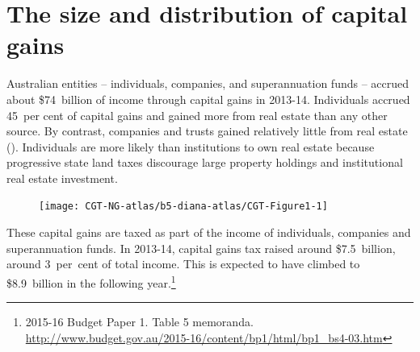 \section{The size and distribution of capital gains}




Australian entities -- individuals, companies, and superannuation funds -- accrued about \$74~billion of income through capital gains in 2013-14. Individuals accrued 45~per cent
of capital gains and gained more from real estate than any other source. By contrast, companies and trusts gained relatively little from real estate (). Individuals are more likely than institutions to own real estate because progressive state land taxes discourage large property holdings and institutional real estate investment.


\begin{figure}[!h]
\label{fig:CGT-by-entity-asset}
\texttt{[image: CGT-NG-atlas/b5-diana-atlas/CGT-Figure1-1]}

\end{figure}

These capital gains are taxed as part of the income of individuals, companies and superannuation funds. In 2013-14, capital gains tax raised around \$7.5~billion, around 3~per~cent of total income. This is expected to have climbed to \$8.9~billion in the following year.\footnote{2015-16 Budget Paper 1. Table 5 memoranda. \url{http://www.budget.gov.au/2015-16/content/bp1/html/bp1_bs4-03.htm}}

